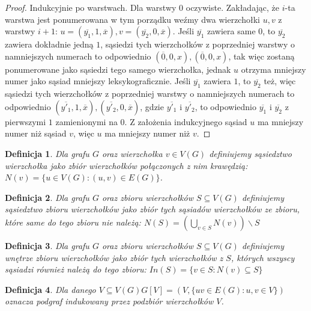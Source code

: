 \documentclass{pracamgr}
\newtheorem{defi}{Definicja}[section] %
\begin{document}
   \begin{proof}
    Indukcyjnie po warstwach.\newline
    Dla warstwy $0$ oczywiste.\newline
    Zakładając, że $i$-ta warstwa jest ponumerowana w tym porządku weźmy dwa wierzchołki $u,v$ z warstwy $i+1$:
    $u=(\overline{y_1},1,\overline{x}),v=(\overline{y_2},0,\overline{x})$.\newline
    Jeśli $\overline{y_1}$ zawiera same $0$, to $\overline{y_2}$ zawiera dokładnie jedną $1$, sąsiedzi tych wierzchołków z poprzedniej warstwy
    o namniejszych numerach to odpowiednio $(\overline{0},0,x),(\overline{0},0,x)$,
    tak więc zostaną ponumerowane jako sąsiedzi tego samego wierzchołka, jednak $u$ otrzyma mniejszy numer jako sąsiad mniejszy leksykograficznie.\newline
    Jeśli $\overline{y_1}$ zawiera $1$, to $\overline{y_2}$ też, więc sąsiedzi tych wierzchołków z poprzedniej warstwy
    o namniejszych numerach to odpowiednio $(\overline{y'_1},1,\overline{x}),(\overline{y'_2},0,\overline{x})$, gdzie $\overline{y'_1}$ i $\overline{y'_2}$,
    to odpowiednio $\overline{y_1}$ i $\overline{y_2}$ z pierwszymi $1$ zamienionymi na $0$. Z założenia indukcyjnego sąsiad $u$ ma mniejszy numer niż sąsiad $v$,
    więc $u$ ma mniejszy numer niż $v$.
   \end{proof}
   \begin{defi}\label{sasiedztwo wierzcholka}
    Dla grafu $G$ oraz wierzchołka $v\in V(G)$ definiujemy \emph{sąsiedztwo wierzchołka} jako zbiór wierzchołków połączonych z nim krawędzią:
    $N(v)=\{u\in V(G):(u,v)\in E(G)\}$.
   \end{defi}
   \begin{defi}\label{sasiedztwo zbioru wierzcholkow}%
    Dla grafu $G$ oraz zbioru wierzchołków $S\subseteq V(G)$ definiujemy \emph{sąsiedztwo zbioru wierzchołków} jako zbiór tych sąsiadów wierzchołków ze zbioru,
    które same do tego zbioru nie należą: $N(S)=(\bigcup_{v\in S}N(v))\backslash S$
   \end{defi}
   \begin{defi}\label{wnetrze zbioru wierzcholkow}
    Dla grafu $G$ oraz zbioru wierzchołków $S\subseteq V(G)$ definiujemy \emph{wnętrze zbioru wierzchołków} jako zbiór tych wierzchołków z $S$,
    których wszyscy sąsiadzi również należą do tego zbioru: $In(S)=\{v\in S:N(v)\subseteq S\}$
   \end{defi}
   \begin{defi}\label{podgraf indukowany}
    Dla danego $V\subseteq V(G)$\quad $G[V]=(V,\{uv\in E(G):u,v\in V\})$ oznacza \emph{podgraf indukowany} przez podzbiór wierzchołków $V$.
   \end{defi}
\end{document}
